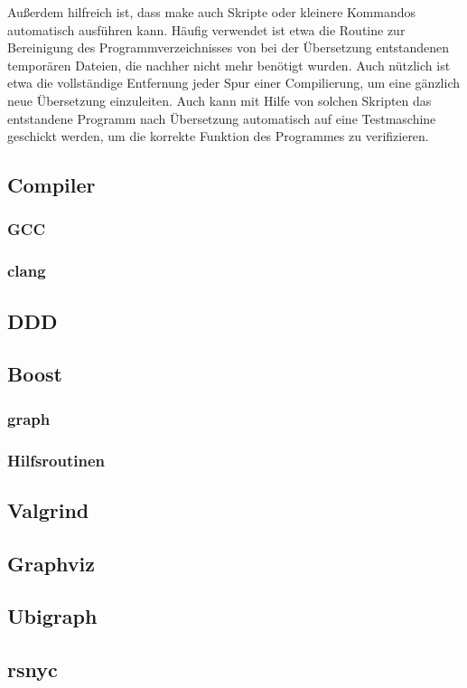 Außerdem hilfreich ist, dass make auch Skripte oder kleinere Kommandos automatisch ausführen kann. Häufig verwendet ist etwa die Routine zur Bereinigung des Programmverzeichnisses von bei der
Übersetzung entstandenen temporären Dateien, die nachher nicht mehr benötigt wurden. Auch nützlich ist etwa die vollständige Entfernung jeder Spur einer Compilierung, um eine gänzlich neue
Übersetzung einzuleiten. Auch kann mit Hilfe von solchen Skripten das entstandene Programm nach Übersetzung automatisch auf eine Testmaschine geschickt werden, um die korrekte Funktion
des Programmes zu verifizieren.

\subsection{Compiler}
\label{sec:compiler}

\subsubsection{GCC}

\subsubsection{clang}

\subsection{DDD}

\subsection{Boost}

\subsubsection{graph}

\subsubsection{Hilfsroutinen}

\subsection{Valgrind}

\subsection{Graphviz}

\subsection{Ubigraph}

\subsection{rsnyc}

